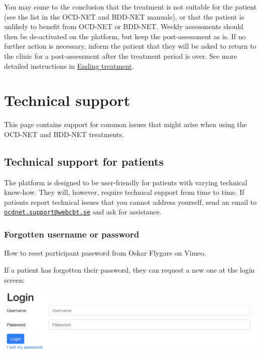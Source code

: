 \documentclass[]{book}
\begin{document}
You may come to the conclusion that the treatment is not suitable for the patient (see the list in the OCD-NET and BDD-NET manuals), or that the patient is unlikely to benefit from OCD-NET or BDD-NET. Weekly assessments should then be de-activated on the platform, but keep the post-assessment as is. If no further action is necessary, inform the patient that they will be asked to return to the clinic for a post-assessment after the treatment period is over. See more detailed instructions in \protect\hyperlink{ending-treatment}{Ending treatment}.

\hypertarget{technical-support}{%
\chapter{Technical support}\label{technical-support}}

This page contains support for common issues that might arise when using the OCD-NET and BDD-NET treatments.

\hypertarget{technical-support-for-patients}{%
\section{Technical support for patients}\label{technical-support-for-patients}}

The platform is designed to be user-friendly for patients with varying technical know-how. They will, however, require technical support from time to time. If patients report technical issues that you cannot address yourself, send an email to \href{mailto:ocdnet.support@webcbt.se}{\nolinkurl{ocdnet.support@webcbt.se}} and ask for assistance.

\hypertarget{forgotten-username-or-password}{%
\subsection{Forgotten username or password}\label{forgotten-username-or-password}}

How to reset participant password from Oskar Flygare on Vimeo.

If a patient has forgotten their password, they can request a new one at the login screen:

\includegraphics{images/patient-login.png}
\end{document}
